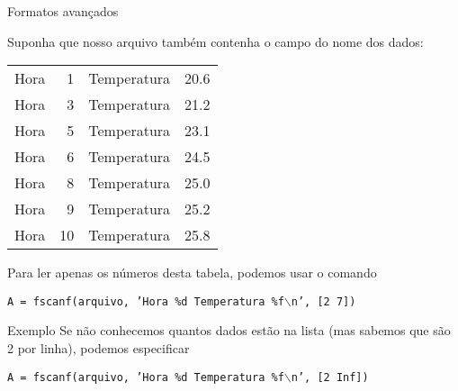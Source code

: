 \documentclass[hyperref={pdfpagelabels=false}]{beamer}
\begin{document}
\begin{frame}{Formatos avançados}

  Suponha que nosso arquivo também contenha o campo do nome dos dados:

  \begin{center}
    \begin{tabular}{l r l r}
      Hora & 1 & Temperatura & 20.6\\
      Hora & 3 & Temperatura & 21.2\\
      Hora & 5 & Temperatura & 23.1\\
      Hora & 6 & Temperatura & 24.5\\
      Hora & 8 & Temperatura & 25.0\\
      Hora & 9 & Temperatura & 25.2\\
      Hora & 10 & Temperatura & 25.8
    \end{tabular}
  \end{center}

  Para ler apenas os números desta tabela, podemos usar o comando

  \begin{center}
    \texttt{A = fscanf(arquivo, 'Hora \%d Temperatura \%f$\backslash$n', [2 7])}
  \end{center}
  
\end{frame}

\begin{frame}{Exemplo}
  Se não conhecemos quantos dados estão na lista (mas sabemos que são 2 por linha), podemos especificar
  \begin{center}
    \texttt{A = fscanf(arquivo, 'Hora \%d Temperatura \%f$\backslash$n', [2 Inf])}
  \end{center}
\end{frame}
\end{document}
